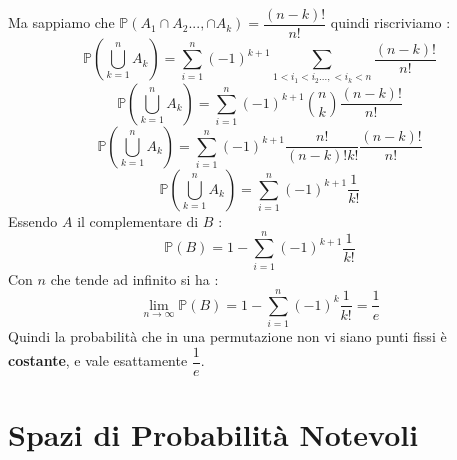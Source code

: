 \documentclass[12pt, letterpaper]{article}
\begin{document}
Ma sappiamo che \(\mathbb{P}(A_1\cap A_2...,\cap A_k) =\dfrac{(n-k)!}{n!}\) quindi riscriviamo :\begin{equation}
    \mathbb{P}(\bigcup^n_{k=1}A_k )=\sum_{i=1}^n (-1)^{k+1}\sum_{1<i_1<i_2...,<i_k<n}\dfrac{(n-k)!}{n!}
\end{equation}
\begin{equation}
    \mathbb{P}(\bigcup^n_{k=1}A_k )=\sum_{i=1}^n (-1)^{k+1}\binom{n}{k} \dfrac{(n-k)!}{n!}
\end{equation}
\begin{equation}
    \mathbb{P}(\bigcup^n_{k=1}A_k )=\sum_{i=1}^n (-1)^{k+1}\dfrac{n!}{(n-k)!k!} \dfrac{(n-k)!}{n!}
\end{equation}
\begin{equation}
    \mathbb{P}(\bigcup^n_{k=1}A_k )=\sum_{i=1}^n (-1)^{k+1}\dfrac{1}{k!}
\end{equation}
Essendo \(A\) il complementare di \(B\) :
\begin{equation}
    \mathbb{P}(B)=1-\sum_{i=1}^n (-1)^{k+1}\dfrac{1}{k!}
\end{equation}
Con \(n\) che tende ad infinito si ha :
\begin{equation}
    \lim_{n\rightarrow \infty }\mathbb{P}(B)=1-\sum_{i=1}^n (-1)^{k}\dfrac{1}{k!}=\dfrac{1}{e}
\end{equation}
Quindi la probabilità che in una permutazione non vi siano punti fissi è \textbf{costante}, e 
vale esattamente \(\dfrac{1}{e}\).
\section{Spazi di Probabilità Notevoli}
\end{document}
